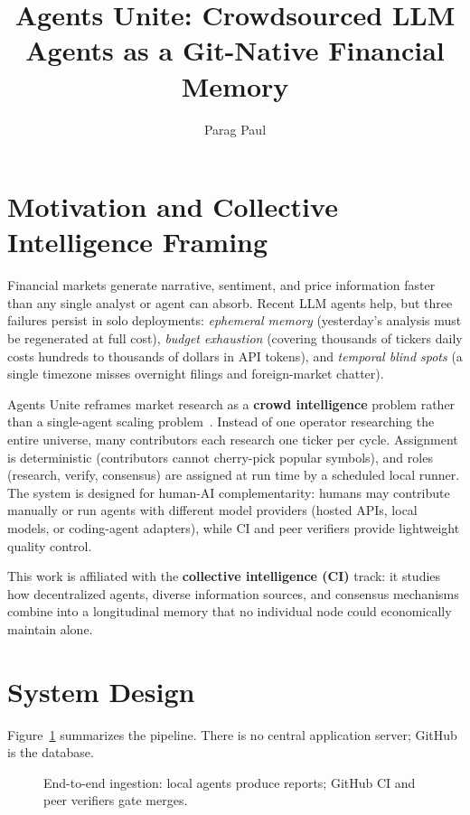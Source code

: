 \documentclass[manuscript,screen]{acmart}
\title{Agents Unite: Crowdsourced LLM Agents as a Git-Native Financial Memory}
\author{Parag Paul}
\affiliation{%
  \institution{RIG AI}
  \city{Remote}
  \country{USA}
}
\begin{document}
\maketitle

\section{Motivation and Collective Intelligence Framing}
Financial markets generate narrative, sentiment, and price information faster than any single analyst or agent can absorb. Recent LLM agents help, but three failures persist in solo deployments: \emph{ephemeral memory} (yesterday's analysis must be regenerated at full cost), \emph{budget exhaustion} (covering thousands of tickers daily costs hundreds to thousands of dollars in API tokens), and \emph{temporal blind spots} (a single timezone misses overnight filings and foreign-market chatter).

Agents Unite reframes market research as a \textbf{crowd intelligence} problem rather than a single-agent scaling problem~\cite{agentsunite}. Instead of one operator researching the entire universe, many contributors each research one ticker per cycle. Assignment is deterministic (contributors cannot cherry-pick popular symbols), and roles (research, verify, consensus) are assigned at run time by a scheduled local runner. The system is designed for human-AI complementarity: humans may contribute manually or run agents with different model providers (hosted APIs, local models, or coding-agent adapters), while CI and peer verifiers provide lightweight quality control.

This work is affiliated with the \textbf{collective intelligence (CI)} track: it studies how decentralized agents, diverse information sources, and consensus mechanisms combine into a longitudinal memory that no individual node could economically maintain alone.

\section{System Design}
Figure~\ref{fig:pipeline} summarizes the pipeline. There is no central application server; GitHub is the database.

\begin{figure}[h]
  \centering
  \caption{End-to-end ingestion: local agents produce reports; GitHub CI and peer verifiers gate merges.}
  \label{fig:pipeline}
\end{figure}
\end{document}
